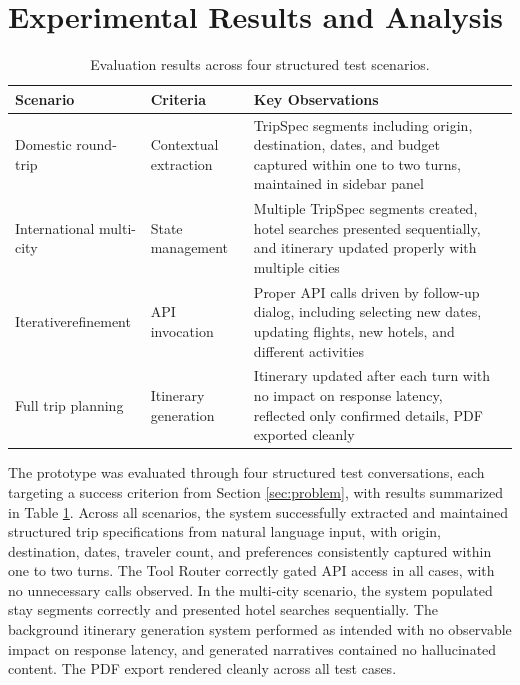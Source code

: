 \documentclass{article}
\begin{document}
\section{Experimental Results and Analysis}
\label{sec:results}
\begin{table}[h]
\centering
\caption{Evaluation results across four structured test scenarios.}
\label{tab:results}
\begin{tabular}{p{2.2cm}p{2.2cm}p{9cm}c}
\toprule
\textbf{Scenario} & \textbf{Criteria} & \textbf{Key Observations} \\
\midrule
Domestic \newline round-trip & Contextual \newline extraction & TripSpec segments including origin, destination, dates, and budget captured within one to two turns, maintained in sidebar panel \\
\addlinespace
International multi-city & State \newline management & Multiple TripSpec segments created, hotel searches presented sequentially, and itinerary updated properly with multiple cities\\
\addlinespace
Iterative\newline refinement & API \newline invocation & Proper API calls driven by follow-up dialog, including selecting new dates, updating flights, new hotels, and different activities  \\
\addlinespace
Full trip \newline planning & Itinerary \newline generation & Itinerary updated after each turn with no impact on response latency, reflected only confirmed details, PDF exported cleanly  \\
\bottomrule
\end{tabular}
\end{table}
The prototype was evaluated through four structured test conversations, each targeting a success criterion from Section \ref{sec:problem}, with results summarized in Table \ref{tab:results}. Across all scenarios, the system successfully extracted and maintained structured trip specifications from natural language input, with origin, destination, dates, traveler count, and preferences consistently captured within one to two turns. The Tool Router correctly gated API access in all cases, with no unnecessary calls observed. In the multi-city scenario, the system populated stay segments correctly and presented hotel searches sequentially. The background itinerary generation system performed as intended with no observable impact on response latency, and generated narratives contained no hallucinated content. The PDF export rendered cleanly across all test cases.
\end{document}
